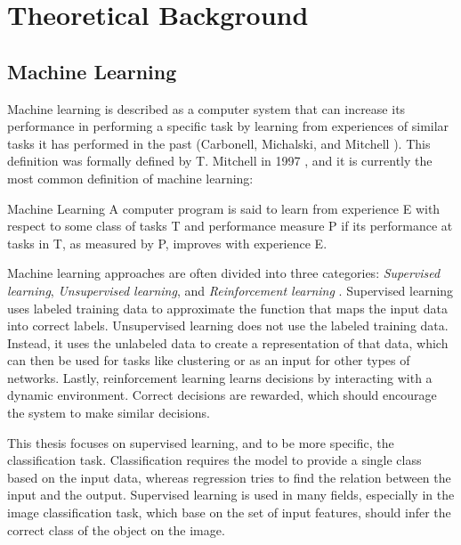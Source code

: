 \chapter{Theoretical Background}\label{chapter:background}
\thispagestyle{chapterBeginStyle}
\label{theoretical-background}

\section{Machine Learning}

Machine learning is described as a computer system that can increase its performance in performing a specific task by learning from experiences of similar tasks it has performed in the past (Carbonell, Michalski, and Mitchell \cite{carbonell1983overview}). This definition was formally defined by T. Mitchell in 1997 \cite{mitchell1997machine}, and it is currently the most common definition of machine learning:

\begin{definition}{Machine Learning}
A computer program is said to learn from experience E with respect to some class of tasks T and performance measure P if its performance at tasks in T, as measured by P, improves with experience E.
\end{definition}

Machine learning approaches are often divided into three categories: \textit{Supervised learning}, \textit{Unsupervised learning}, and \textit{Reinforcement learning} \cite{ayodele2010types}. Supervised learning uses labeled training data to approximate the function that maps the input data into correct labels. Unsupervised learning does not use the labeled training data. Instead, it uses the unlabeled data to create a representation of that data, which can then be used for tasks like clustering or as an input for other types of networks. Lastly, reinforcement learning learns decisions by interacting with a dynamic environment. Correct decisions are rewarded, which should encourage the system to make similar decisions.

\vspace{\baselineskip}

This thesis focuses on supervised learning, and to be more specific, the classification task. Classification requires the model to provide a single class based on the input data, whereas regression tries to find the relation between the input and the output. Supervised learning is used in many fields, especially in the image classification task, which base on the set of input features, should infer the correct class of the object on the image.

